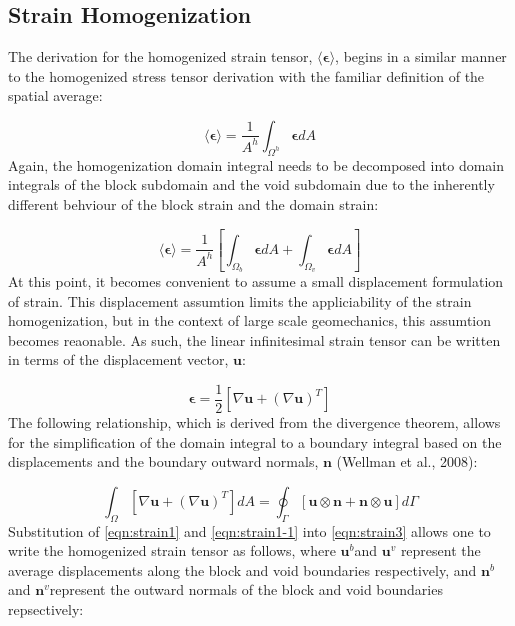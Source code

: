 \subsection{Strain Homogenization}

The derivation for the homogenized strain tensor, $\langle\boldsymbol{\epsilon}\rangle$,
begins in a similar manner to the homogenized stress tensor derivation
with the familiar definition of the spatial average:

\begin{equation}
\langle\boldsymbol{\epsilon}\rangle=\frac{1}{A^{h}}\int_{\Omega^{h}}\boldsymbol{\epsilon}dA\label{eqn:strain2}
\end{equation}
Again, the homogenization domain integral needs to be decomposed into
domain integrals of the block subdomain and the void subdomain due
to the inherently different behviour of the block strain and the domain
strain:

\begin{equation}
\langle\boldsymbol{\epsilon}\rangle=\frac{1}{A^{h}}\left[\int_{\Omega_{b}}\boldsymbol{\epsilon}dA+\int_{\Omega_{v}}\boldsymbol{\epsilon}dA\right]\label{eqn:strain3}
\end{equation}
At this point, it becomes convenient to assume a small displacement
formulation of strain. This displacement assumtion limits the appliciability
of the strain homogenization, but in the context of large scale geomechanics,
this assumtion becomes reaonable. As such, the linear infinitesimal
strain tensor can be written in terms of the displacement vector, $\mathbf{u}$:

\begin{equation}
\boldsymbol{\epsilon}=\frac{1}{2}\left[\nabla\mathbf{u}+\left(\nabla\mathbf{u}\right)^{T}\right]\label{eqn:strain1}
\end{equation}
The following relationship, which is derived from the divergence theorem,
allows for the simplification of the domain integral to a boundary
integral based on the displacements and the boundary outward normals,
$\mathbf{n}$ (Wellman et al., 2008):

\begin{equation}
\int_{\Omega}\left[\nabla\mathbf{u}+\left(\nabla\mathbf{u}\right)^{T}\right]dA=\oint_{\Gamma}\left[\mathbf{u}\otimes\mathbf{n}+\mathbf{n}\otimes\mathbf{u}\right]d\Gamma\label{eqn:strain1-1}
\end{equation}
Substitution of \ref{eqn:strain1} and \ref{eqn:strain1-1} into \ref{eqn:strain3}
allows one to write the homogenized strain tensor as follows, where
$\mathbf{u}^{b}$and $\mathbf{u}^{v}$ represent the average displacements
along the block and void boundaries respectively, and $\mathbf{n}^{b}$and
$\mathbf{n}^{v}$represent the outward normals of the block and void
boundaries repsectively:

